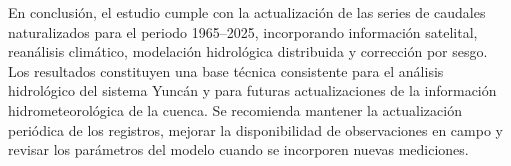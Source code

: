 En conclusión, el estudio cumple con la actualización de las series de caudales
naturalizados para el periodo 1965--2025, incorporando información satelital,
reanálisis climático, modelación hidrológica distribuida y corrección por sesgo.
Los resultados constituyen una base técnica consistente para el análisis
hidrológico del sistema Yuncán y para futuras actualizaciones de la información
hidrometeorológica de la cuenca. Se recomienda mantener la actualización
periódica de los registros, mejorar la disponibilidad de observaciones en campo
y revisar los parámetros del modelo cuando se incorporen nuevas mediciones.
